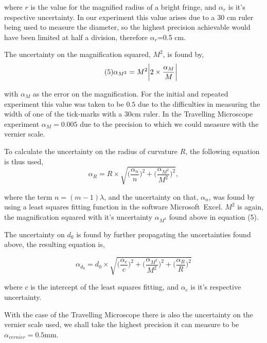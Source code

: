 \documentclass[twocolumn]{revtex4}
\begin{document}
where $r$ is the value for the magnified radius of a bright fringe, and $\alpha_r$ is it's respective uncertainty. In our experiment this value arises due to a 30 cm ruler being used to measure the diameter, so the highest precision achievable would have been limited at half a division, therefore $\alpha_r$=0.5 cm. 

The uncertainty on the magnification squared, $M^2$, is found by,
\begin{equation} \tag{5}
\alpha_{M^2}=M^2\abs{2\times\frac{\alpha_M}{M}}
\end{equation}

with $\alpha_{M}$ as the error on the magnification. For the initial and repeated experiment this value was taken to be $0.5$ due to the difficulties in measuring the width of one of the tick-marks with a $30$cm ruler. In the Travelling Microscope experiment $\alpha_{M}=0.005$ due to the precision to which we could measure with the vernier scale.    

To calculate the uncertainty on the radius of curvature $R$, the following equation is thus used,
\begin{equation} \tag{6}
\alpha_R=R\times\sqrt{\Big(\frac{\alpha_n}{n}\Big)^2 + \Big(\frac{\alpha_{M^2}}{M^2}\Big)^2 },
\end{equation}

where the term $n=(m-1)\lambda$, and the uncertainty on that, $\alpha_n$, was found by using a least squares fitting function in the software Microsoft\textregistered \ Excel. $M^2$ is again, the magnification squared with it's uncertainty $\alpha_{M^2}$ found above in equation (5).  

The uncertainty on $d_0$ is found by further propagating the uncertainties found above, the resulting equation is, 

\begin{equation} \tag{7}
\alpha_{d_0}=d_0\times\sqrt{\Big(\frac{\alpha_c}{c}\Big)^2 + \Big(\frac{\alpha_{M^2}}{M^2}\Big)^2 + \Big(\frac{\alpha_R}{R}\Big)^2}
\end{equation}

where $c$ is the intercept of the least squares fitting, and $\alpha_c$ is it's respective uncertainty.

With the case of the Travelling Microscope there is also the uncertainty on the vernier scale used, we shall take the highest precision it can measure to be $\alpha_{vernier}=0.5$mm.

\clearpage

\end{document}
